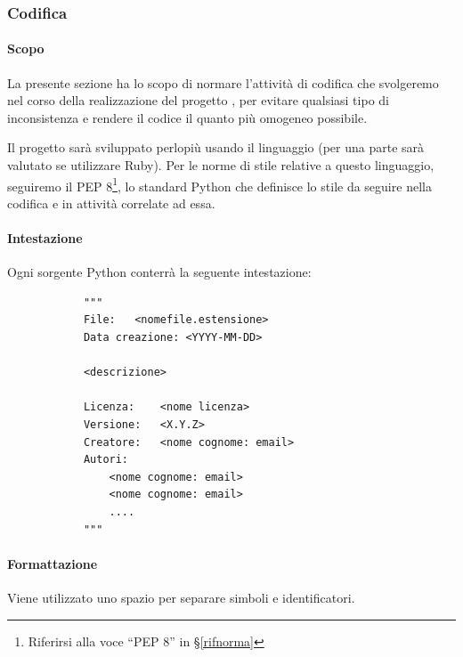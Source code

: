 

        \newpage

		\subsubsection{Codifica}\label{PP:Sviluppo:Codifica}

		\paragraph{Scopo}
		La presente sezione ha lo scopo di normare l'attività di codifica che svolgeremo nel corso della realizzazione del progetto \progetto, per
		evitare qualsiasi tipo di inconsistenza e rendere il codice il quanto più omogeneo possibile.

		Il progetto sarà sviluppato perlopiù usando il linguaggio  (per una parte sarà valutato se utilizzare Ruby).
		Per le norme di stile relative a questo linguaggio, seguiremo il PEP 8\footnote{Riferirsi alla voce ``PEP 8'' in \S\ref{rifnorma}},
		lo standard Python che definisce lo stile da seguire nella codifica e in attività correlate ad essa.

        \paragraph{Intestazione}\label{PP:Sviluppo:Codifica:Intestazione}
		Ogni sorgente Python conterrà la seguente intestazione:
		\begin{verbatim}
			"""
			File:	<nomefile.estensione>
			Data creazione: <YYYY-MM-DD>

			<descrizione>

			Licenza:	<nome licenza>
			Versione:	<X.Y.Z>
			Creatore:	<nome cognome: email>
			Autori:
				<nome cognome: email>
				<nome cognome: email>
				....
			"""
		\end{verbatim}

		\paragraph{Formattazione}\label{PP:Sviluppo:Codifica:Formattazione}
		Viene utilizzato uno spazio per separare simboli e identificatori.
		


